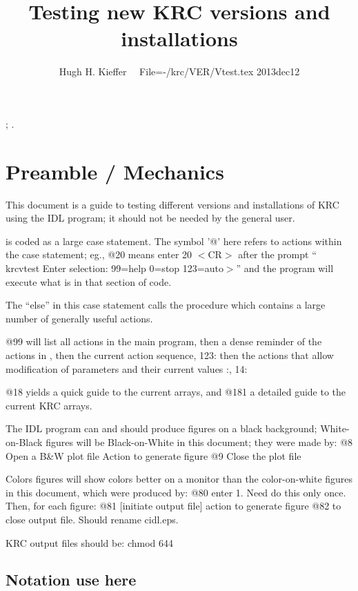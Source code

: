\documentclass{article}  %
\title{Testing new KRC versions and installations}
\author{Hugh H. Kieffer  \ \ File=-/krc/VER/Vtest.tex 2013dec12}
\begin{document}
\maketitle
\tableofcontents
\listoffigures
; \hrulefill .\hrulefill

\section{Preamble / Mechanics}
This document is a guide to testing different versions and installations of KRC using the  IDL program; it
should not be needed by the general user.

  is coded as a large case statement. The symbol '@' here
 refers to actions within the case statement; eg., @20 means enter 20 $<$CR$>$ after
 the prompt `` krcvtest Enter selection: 99=help 0=stop 123=auto$>$'' and the
 program will execute what is in that section of code.

The ``else'' in this case statement calls the procedure  which contains a large number of generally useful actions. 

@99 will list all actions in the main program, 
\qi then a dense reminder of the actions in , 
\qi then the current action sequence, 123:
\qi then the actions that allow modification of parameters and their current values
:, 14: 

@18 yields a quick guide to the current arrays, and @181 a detailed guide to the current KRC arrays.

The IDL program can and should produce figures on a black background; White-on-Black figures will be Black-on-White in this document; they were made by:
\qi @8 Open a B\&W  plot file
\qii  Action to generate figure
\qi @9 Close the plot file
 
Colors figures will show colors better on a monitor than the color-on-white figures in this document, which were produced by:
\qi @80  enter 1.  Need do this only once.  Then, for each figure:
\qi @81 [initiate output file]
\qi  action to generate figure
\qi @82  to close output file. Should rename cidl.eps.

KRC output files should be: chmod 644

\subsection{Notation use here}
\end{document}
